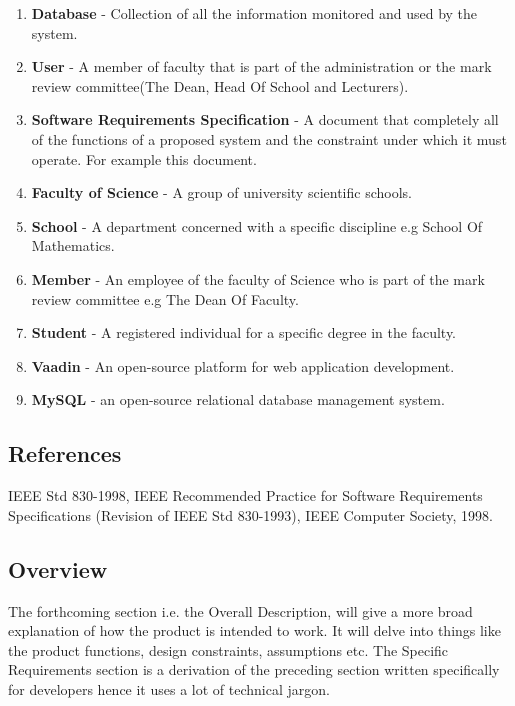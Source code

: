 \documentclass{article}
\begin{document}
\begin{enumerate}
    \item \large{\textbf{Database} - Collection of all the information monitored and used by the system.}
    \item \large{\textbf{User} - A member of faculty that is part of the administration or the mark review committee(The Dean, Head Of School and Lecturers).}
    \item \large{\textbf{Software Requirements Specification} - A document that completely all of the functions of a proposed system and the constraint under which it must operate. For example this document.}
    \item \large{\textbf{Faculty of Science} - A group of university scientific schools.}
    \item \large{\textbf{School} - A department concerned with a specific discipline e.g School Of Mathematics.}
    \item \large{\textbf{Member} - An employee of the faculty of Science who is part of the mark review committee  e.g The Dean Of Faculty.}
    \item \large{\textbf{Student} - A registered individual for a specific degree in the faculty.}
    \item \large{\textbf{Vaadin} - An open-source platform for web application development.}
    \item \large{\textbf{MySQL} - an open-source relational database management system.}
\end{enumerate}

\subsection{References}

\large{IEEE Std 830-1998, IEEE Recommended Practice for Software Requirements Specifications 
(Revision of IEEE Std 830-1993), IEEE Computer Society, 1998.}


\subsection{Overview}

\large{The forthcoming section i.e. the Overall Description, will give a more broad explanation of how the product
is intended to work. It will delve into things like the product functions, design constraints, assumptions etc.
The  Specific Requirements section is a derivation of the preceding section written specifically for developers
hence it uses a lot of technical jargon.}
\end{document}

